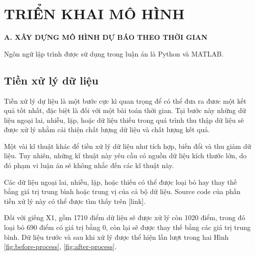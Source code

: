 \documentclass[12pt,a4paper]{report}
\begin{document}
\clearpage


\tableofcontents
{}

\listoffigures
{}

\listoftables
{}

\printnomenclature
{}

\clearpage
{}
\newpage

\chapter{TRIỂN KHAI MÔ HÌNH}
\begin{center}
	\centering
	\textbf{A. XÂY DỰNG MÔ HÌNH DỰ BÁO THEO THỜI GIAN}
\end{center}
Ngôn ngữ lập trình được sử dụng trong luận án là Python và MATLAB.
\section{Tiền xử lý dữ liệu}
Tiền xử lý dự liệu là một bước cực kì quan trọng để có thể đưa ra đươc một kết quả tốt nhất, đặc biệt là đối với một bài toán thời gian. Tại bước này những dữ liệu ngoại lai, nhiễu, lặp, hoặc dữ liệu thiếu trong quá trình thu thập dữ liệu sẽ được xử lý nhằm cải thiện chất lượng dữ liệu và chất lượng kết quả.

Một vài kĩ thuật khác để tiền xử lý dữ liệu như tích hợp, biến đổi và thu giảm dữ liệu. Tuy nhiên, những kĩ thuật này yêu cầu có nguồn dữ liệu kích thước lớn, do đó phạm vi luận án sẽ không nhắc đến các kĩ thuật này.

Các dữ liệu ngoại lai, nhiễu, lặp, hoặc thiếu có thể được loại bỏ hay thay thế bằng giá trị trung bình hoặc trung vị của cả bộ dữ liệu. Source code của phần tiền xử lý này có thể được tìm thấy trên [link].

Đối với giếng X1, gồm 1710 điểm dữ liệu sẽ được xử lý còn 1020 điểm, trong đó loại bỏ 690 điểm có giá trị bằng 0, còn lại sẽ được thay thế bằng các giá trị trung bình. Dữ liệu trước và sau khi xử lý được thể hiện lần lượt trong hai Hình \ref{fig:before-process}, \ref{fig:after-process}.
\end{document}
